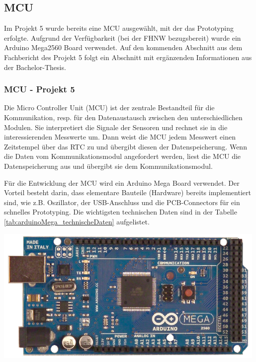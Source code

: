\subsection{MCU}
\label{subsec:MCU}
Im Projekt 5 wurde bereits eine MCU ausgewählt, mit der das Prototyping erfolgte. Aufgrund der Verfügbarkeit (bei der FHNW bezugsbereit) wurde ein Arduino Mega2560 Board verwendet. Auf den kommenden Abschnitt aus dem Fachbericht des Projekt 5 folgt ein Abschnitt mit ergänzenden Informationen aus der Bachelor-Thesis.

\subsubsection{MCU - Projekt 5}
Die Micro Controller Unit (MCU) ist der zentrale Bestandteil für die Kommunikation, resp. für den Datenaustausch zwischen den unterschiedlichen Modulen. Sie interpretiert die Signale der Sensoren und rechnet sie in die interessierenden Messwerte um. Dann weist die MCU jedem Messwert einen Zeitstempel über das RTC zu und übergibt diesen der Datenspeicherung. Wenn die Daten vom Kommunikationsmodul angefordert werden, liest die MCU die Datenspeicherung aus und übergibt sie dem Kommunikationsmodul.\\

{\begin{minipage}[b][130pt][t]{0.5\textwidth}
Für die Entwicklung der MCU wird ein Arduino Mega Board verwendet. Der Vorteil besteht darin, dass elementare Bauteile (Hardware) bereits implementiert sind, wie z.B. Oszillator, der USB-Anschluss und die PCB-Connectors für ein schnelles Prototyping. Die wichtigsten technischen Daten sind in der Tabelle \ref{tab:arduinoMega_technischeDaten} aufgelistet.\\
\end{minipage}}
\hfill
{\begin{minipage}[b][130pt][t]{0.49\textwidth}
\centering
\includegraphics[width=0.99\textwidth]{graphics/MCU/arduino_mega.png}
\label{fig:arduinoMega}
\end{minipage}}

